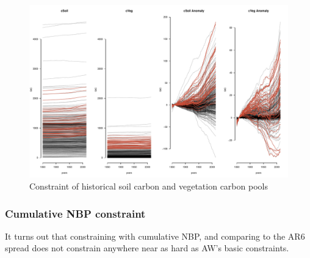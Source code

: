 \documentclass[gmd, manuscript]{copernicus}
\begin{document}
%
\begin{figure}[t]
\includegraphics[width=12cm]{./graphics/vegC-soilC-constrained.pdf}
\caption{Constraint of historical soil carbon and vegetation carbon pools}
\label{fig:vegC-soilC-constrained}
\end{figure}



\subsubsection{Cumulative NBP constraint}

It turns out that constraining with cumulative NBP, and comparing to the AR6 spread does not constrain anywhere near as hard as AW's basic constraints.
\end{document}

